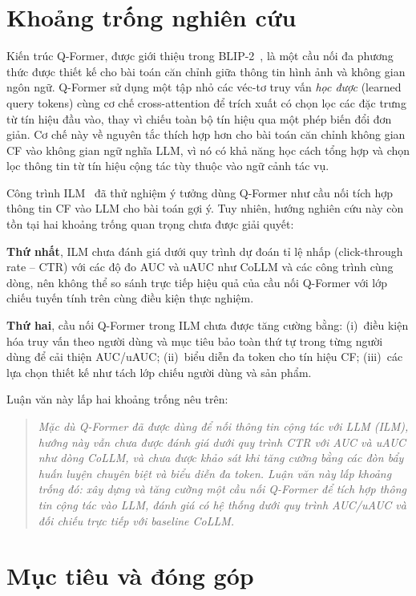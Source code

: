 \section{Khoảng trống nghiên cứu}
\label{sec:khoang-trong}

Kiến trúc Q-Former, được giới thiệu trong BLIP-2~\cite{blip2_2023}, là một cầu nối đa
phương thức được thiết kế cho bài toán căn chỉnh giữa thông tin hình ảnh và không gian
ngôn ngữ. Q-Former sử dụng
một tập nhỏ các véc-tơ truy vấn \textit{học được} (learned query tokens) cùng cơ chế
cross-attention để trích xuất có chọn lọc các đặc trưng từ tín hiệu đầu vào, thay vì
chiếu toàn bộ tín hiệu qua một phép biến đổi đơn giản. Cơ chế này về nguyên tắc thích
hợp hơn cho bài toán căn chỉnh không gian CF vào không gian ngữ nghĩa LLM, vì nó có
khả năng học cách tổng hợp và chọn lọc thông tin từ tín hiệu cộng tác tùy thuộc vào
ngữ cảnh tác vụ.

Công trình ILM~\cite{ilm2024} đã thử nghiệm ý tưởng dùng Q-Former như cầu nối tích hợp
thông tin CF vào LLM cho bài toán gợi ý. Tuy nhiên, hướng nghiên cứu này còn tồn tại
hai khoảng trống quan trọng chưa được giải quyết:

\textbf{Thứ nhất}, ILM chưa đánh giá dưới quy trình dự đoán tỉ lệ nhấp (click-through
rate -- CTR) với các độ đo AUC và uAUC như CoLLM và các công trình cùng dòng, nên không
thể so sánh trực tiếp hiệu quả của cầu nối Q-Former với lớp chiếu tuyến tính trên cùng
điều kiện thực nghiệm.

\textbf{Thứ hai}, cầu nối Q-Former trong ILM chưa được tăng cường bằng: (i)~điều kiện hóa
truy vấn theo người dùng và mục tiêu bảo toàn thứ tự trong từng người dùng để cải thiện AUC/uAUC;
(ii)~biểu diễn đa token cho tín hiệu CF; (iii)~các lựa chọn thiết kế như tách lớp chiếu
người dùng và sản phẩm.

Luận văn này lấp hai khoảng trống nêu trên:

\begin{quote}
\textit{Mặc dù Q-Former đã được dùng để nối thông tin cộng tác với LLM (ILM), hướng này
vẫn chưa được đánh giá dưới quy trình CTR với AUC và uAUC như dòng CoLLM, và chưa được
khảo sát khi tăng cường bằng các đòn bẩy huấn luyện chuyên biệt và biểu diễn đa token.
Luận văn này lấp khoảng trống đó: xây dựng và tăng cường một cầu nối Q-Former để tích
hợp thông tin cộng tác vào LLM, đánh giá có hệ thống dưới quy trình AUC/uAUC và đối
chiếu trực tiếp với baseline CoLLM.}
\end{quote}

\section{Mục tiêu và đóng góp}
\label{sec:dong-gop}

